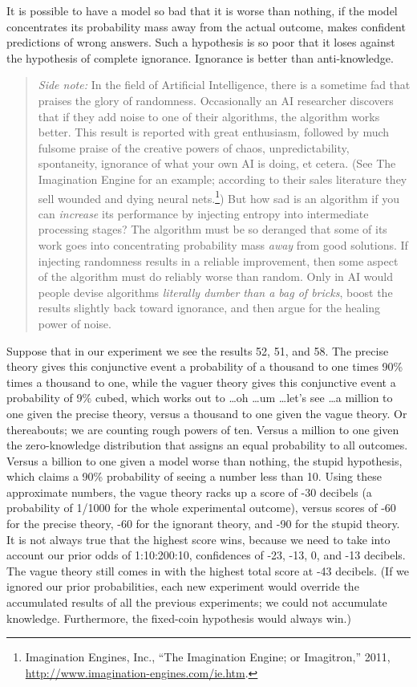 {
 It is possible to have a model so bad that it is worse than
nothing, if the model concentrates its probability mass away from the
actual outcome, makes confident predictions of wrong answers. Such a
hypothesis is so poor that it loses against the hypothesis of complete
ignorance. Ignorance is better than anti-knowledge.}

\begin{quote}
{
 \textit{Side note:} In the field of Artificial Intelligence, there
is a sometime fad that praises the glory of randomness. Occasionally an
AI researcher discovers that if they add noise to one of their
algorithms, the algorithm works better. This result is reported with
great enthusiasm, followed by much fulsome praise of the creative
powers of chaos, unpredictability, spontaneity, ignorance of what your
own AI is doing, et cetera. (See The Imagination Engine for an example;
according to their sales literature they sell wounded and dying neural
nets.\footnote{Imagination Engines, Inc., ``The Imagination
Engine{\texttrademark}; or
Imagitron{\texttrademark},'' 2011,
\url{http://www.imagination-engines.com/ie.htm}.}) But how sad is an algorithm if you can
\textit{increase} its performance by injecting entropy into
intermediate processing stages? The algorithm must be so deranged that
some of its work goes into concentrating probability mass \textit{away}
from good solutions. If injecting randomness results in a reliable
improvement, then some aspect of the algorithm must do reliably worse
than random. Only in AI would people devise algorithms
\textit{literally dumber than a bag of bricks}, boost the results
slightly back toward ignorance, and then argue for the healing power of
noise.}
\end{quote}

{
 Suppose that in our experiment we see the results 52, 51, and 58.
The precise theory gives this conjunctive event a probability of a
thousand to one times 90\% times a thousand to one, while the vaguer
theory gives this conjunctive event a probability of 9\% cubed, which
works out to \ldots oh \ldots um \ldots let's see \ldots a
million to one given the precise theory, versus a thousand to one given
the vague theory. Or thereabouts; we are counting rough powers of ten.
Versus a million to one given the zero-knowledge distribution that
assigns an equal probability to all outcomes. Versus a billion to one
given a model worse than nothing, the stupid hypothesis, which claims a
90\% probability of seeing a number less than 10. Using these
approximate numbers, the vague theory racks up a score of -30 decibels
(a probability of 1/1000 for the whole experimental outcome), versus
scores of -60 for the precise theory, -60 for the ignorant theory, and
-90 for the stupid theory. It is not always true that the highest score
wins, because we need to take into account our prior odds of
1:10:200:10, confidences of -23, -13, 0, and -13 decibels. The vague
theory still comes in with the highest total score at -43 decibels. (If
we ignored our prior probabilities, each new experiment would override
the accumulated results of all the previous experiments; we could not
accumulate knowledge. Furthermore, the fixed-coin hypothesis would
always win.)}

